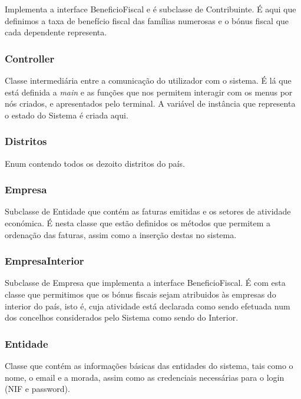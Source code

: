 \documentclass[a4paper]{article}
\begin{document}
Implementa a interface BeneficioFiscal e é subclasse de Contribuinte. É aqui que definimos a taxa de benefício fiscal das famílias numerosas e o bónus fiscal que cada dependente representa.


\subsubsection{Controller} %

Classe intermediária entre a comunicação do utilizador com o sistema. É lá que está definida a \textit{main} e as funções que nos permitem interagir com os menus por nós criados, e apresentados pelo terminal. A variável de instância que representa o estado do Sistema é criada aqui.


\subsubsection{Distritos} %

Enum contendo todos os dezoito distritos do país.


\subsubsection{Empresa} %

Subclasse de Entidade que contém as faturas emitidas e os setores de atividade económica. É nesta classe que estão definidos os métodos que permitem a ordenação das faturas, assim como a inserção destas no sistema.


\subsubsection{EmpresaInterior} %

Subclasse de Empresa que implementa a interface BeneficioFiscal. É com esta classe que permitimos que os bónus fiscais sejam atribuidos às empresas do interior do país, isto é, cuja atividade está declarada como sendo efetuada num dos concelhos considerados pelo Sistema como sendo do Interior.


\subsubsection{Entidade} %

Classe que contém as informações básicas das entidades do sistema, tais como o nome, o email e a morada, assim como as credenciais necessárias para o login (NIF e password).
\end{document}
